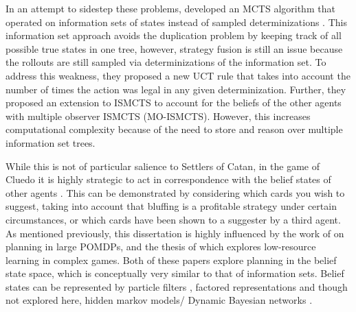 \documentclass[msc, deptreport, ai, romanprepages]{infthesis}
\begin{document}
In an attempt to sidestep these problems, \cite{Cowling} developed an MCTS algorithm that operated on information sets of states instead of sampled determinizations \cite{Cowling}. This information set approach avoids the duplication problem by keeping track of all possible true states in one tree, however, strategy fusion is still an issue because the rollouts are still sampled via determinizations of the information set. To address this weakness, they proposed a new UCT rule that takes into account the number of times the action was legal in any given determinization. Further, they proposed an extension to ISMCTS to account for the beliefs of the other agents with multiple observer ISMCTS (MO-ISMCTS). However, this increases computational complexity because of the need to store and reason over multiple information set trees. 

While this is not of particular salience to Settlers of Catan, in the game of Cluedo it is highly strategic to act in correspondence with the belief states of other agents \cite{Mihai}. This can be demonstrated by considering which cards you wish to suggest, taking into account that bluffing is a profitable strategy under certain circumstances, or which cards have been shown to a suggester by a third agent. As mentioned previously, this dissertation is highly influenced by the work of \cite{Silver-veness} on planning in large POMDPs, and the thesis of \cite{Mihai} which explores low-resource learning in complex games. Both of these papers explore planning in the belief state space, which is conceptually very similar to that of information sets. Belief states can be represented by particle filters \cite{Silver-veness}, factored representations \cite{Mihai} and though not explored here, hidden markov models/ Dynamic Bayesian networks \cite{Russell-norvig}. 
\end{document}
